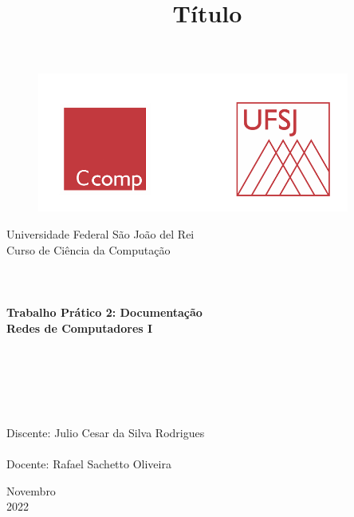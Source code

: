 \documentclass[a4paper, 12pt]{article}
\begin{document}

\begin{titlepage}
	\begin{center}
	
	\begin{figure}[ht]
    \centering
    \includegraphics[width=.44\textwidth]{Images/LogoUFSJ.PNG}
    \label{fig:Capturar.PNG}
    \end{figure}

    	\Huge{Universidade Federal São João del Rei}\\
		\Large{Curso de Ciência da Computação}\\ 

        \vspace{110pt}
        \textbf{\LARGE{
        \\
        \\
        \\
        Trabalho Prático 2: Documentação\\
        \vspace{0.5cm}
        \Large{Redes de Computadores I}
        \\
        \\
        \\
        }}
        
		\title{{\large{Título}}}
		\vspace{2.5cm}
	\end{center}
	    
    \begin{flushleft}
		\begin{tabbing}
		\\
		\\
		\\	
		\large{Discente: Julio Cesar da Silva Rodrigues}\\
	    \\
		\large{Docente: Rafael Sachetto Oliveira}\\
	    \end{tabbing}
    \end{flushleft}
	\vspace{1cm}
	
	\begin{center}
		\vspace{\fill}
			Novembro\\
		    2022
	\end{center}
\end{titlepage}
\end{document}

